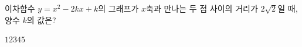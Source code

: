 이차함수 $y=x^2-2kx+k$의 그래프가 $x$축과 만나는 두 점 사이의 거리가 $2\sqrt{2}$일 때, 양수 $k$의 값은?
\begin{choices32}{$1$}{$2$}{$3$}{$4$}{$5$}\end{choices32}
